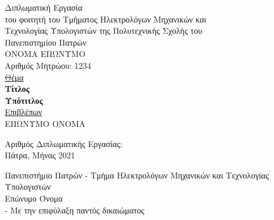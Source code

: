 \begin{titlepage}
\vspace*{0.7cm} 

\begin{center}
{\LARGE Διπλωματική Εργασία} 								\\
{\Large του φοιτητή του Τμήματος Ηλεκτρολόγων Μηχανικών και \\
Τεχνολογίας Υπολογιστών της Πολυτεχνικής Σχολής του 		\\[0.1cm]
Πανεπιστημίου Πατρών} 										\\ [1.3cm]

{\Large 
	ΟΝΟΜΑ ΕΠΩΝΥΜΟ                                      		\\ [0.1cm]
	Αριθμός Μητρώου: 1234 
} 															\\ [1.3cm]

\Large \underline {Θέμα} 									\\[0.2cm]
{\LARGE \bfseries Τίτλος}  									\\
{\Large \bfseries Υπότιτλος} 								\\[1cm] 

\Large \underline{Επιβλέπων} 								\\[0.2cm]
{ \Large    ΕΠΩΝΥΜΟ ΟΝΟΜΑ} 									\\

\vspace*{1.3cm} 


Αριθμός Διπλωματικής Εργασίας: 								\\[0.6cm] 
 

Πάτρα, Μήνας 2021 
\end{center}

\vfill %

\end{titlepage}

\newpage 

\thispagestyle{empty} 

\vspace*{20cm}
Πανεπιστήμιο Πατρών - Τμήμα Ηλεκτρολόγων Μηχανικών και Τεχνολογίας Υπολογιστών\\ 
Επώνυμο Όνομα\\
  
 - Με την επιφύλαξη παντός δικαιώματος